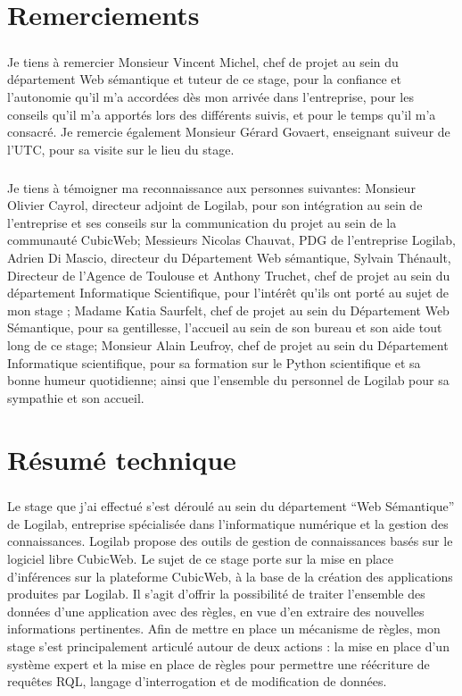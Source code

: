 \documentclass {report}
\begin{document}
\chapter*{Remerciements}

\paragraph{}
Je tiens à remercier Monsieur Vincent Michel, chef de projet au sein du département Web sémantique et tuteur de ce stage, pour la confiance et l'autonomie qu’il m’a accordées dès mon arrivée dans l’entreprise, pour les conseils qu'il m'a apportés lors des différents suivis, et pour le temps qu'il m'a consacré. Je remercie également Monsieur Gérard Govaert, enseignant suiveur de l'UTC, pour sa visite sur le lieu du stage. 
\paragraph{}
Je tiens à témoigner ma reconnaissance aux personnes suivantes: Monsieur Olivier Cayrol, directeur adjoint de Logilab, pour son intégration au sein de l'entreprise et ses conseils sur la communication du projet au sein de la communauté CubicWeb; Messieurs Nicolas Chauvat, PDG de l'entreprise Logilab, Adrien Di Mascio, directeur du Département Web sémantique, Sylvain Thénault, Directeur de l'Agence de Toulouse et Anthony Truchet, chef de projet au sein du département Informatique Scientifique,  pour l'intérêt qu'ils ont porté au sujet de mon stage ; Madame Katia Saurfelt, chef de projet au sein du Département Web Sémantique, pour sa gentillesse, l'accueil au sein de son bureau et son aide tout long de ce stage; Monsieur Alain Leufroy, chef de projet au sein du Département Informatique scientifique, pour sa formation sur le Python scientifique et sa bonne humeur quotidienne; ainsi que l'ensemble du personnel de Logilab pour sa sympathie et son accueil.



\chapter*{Résumé technique}
\paragraph{}
Le stage que j'ai effectué s'est déroulé au sein du département “Web Sémantique” de Logilab, entreprise spécialisée dans l’informatique numérique et la gestion des connaissances. Logilab propose des outils de gestion de connaissances basés sur le logiciel libre CubicWeb. Le sujet de ce stage porte sur la mise en place d'inférences sur la plateforme CubicWeb, à la base de la création des applications produites par Logilab. Il s'agit d'offrir la possibilité de traiter l'ensemble des données d'une application avec des règles, en vue d'en extraire des nouvelles informations pertinentes. Afin de mettre en place un mécanisme de règles, mon stage s'est principalement articulé autour de deux actions : la mise en place d'un système expert et la mise en place de règles pour permettre une réécriture de requêtes RQL, langage d'interrogation et de modification de données.
\end{document}
